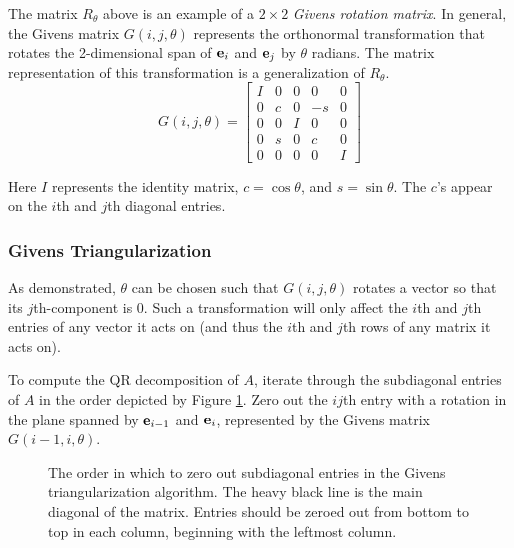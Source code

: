 The matrix $R_{\theta}$ above is an example of a $2 \times 2$ \emph{Givens rotation matrix}.
In general, the Givens matrix $G(i,j,\theta)$ represents the orthonormal transformation that rotates the 2-dimensional span of $\mathbf{e}_i$ and $\mathbf{e}_j$ by $\theta$ radians.
The matrix representation of this transformation is a generalization of $R_\theta$.
\[
G(i,j,\theta) =
\left[\begin{array}{ccccc}
I & 0 & 0 & 0 & 0 \\
0 & c & 0 & -s & 0 \\
0 & 0 & I & 0 & 0 \\
0 & s & 0 & c & 0 \\
0 & 0 & 0 & 0 & I
\end{array}\right]
\]

Here $I$ represents the identity matrix, $c=\cos \theta$, and $s=\sin \theta$.
The $c$'s appear on the $i$th and $j$th diagonal entries.

\subsubsection*{Givens Triangularization} %

As demonstrated, $\theta$ can be chosen such that $G(i,j,\theta)$ rotates a vector so that its $j$th-component is 0.
Such a transformation will only affect the $i$th and $j$th entries of any vector it acts on (and thus the $i$th and $j$th rows of any matrix it acts on).

To compute the QR decomposition of $A$, iterate through the subdiagonal entries of $A$ in the order depicted by Figure \ref{fig:Givens-iteration-order}.
Zero out the $ij$th entry with a rotation in the plane spanned by $\mathbf{e}_{i-1}$ and $\mathbf{e}_i$, represented by the Givens matrix $G(i-1,i,\theta)$.

\begin{figure}[H]
\centering
{}
\caption{The order in which to zero out subdiagonal entries in the Givens triangularization algorithm.
The heavy black line is the main diagonal of the matrix.
Entries should be zeroed out from bottom to top in each column, beginning with the leftmost column.}
\label{fig:Givens-iteration-order}
\end{figure}

